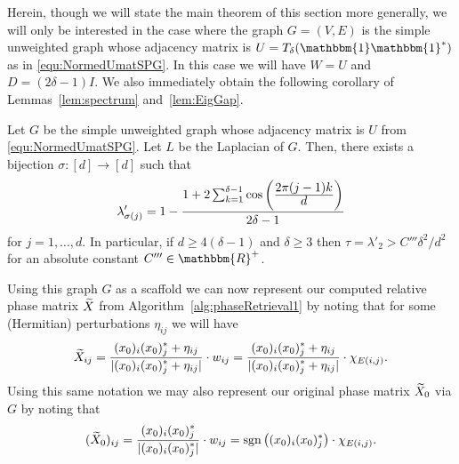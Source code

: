 Herein, though we will state the main theorem of this section more generally, we will only be interested in the case where the graph $G=(V,E)$ is the simple unweighted graph whose adjacency matrix is $U = T_{\delta}(\mathbbm{1} \mathbbm{1}^*)$ as in \eqref{equ:NormedUmatSPG}.  In this case we will have $W = U$ and $D = (2 \delta - 1)I$.  We also immediately obtain the following corollary of Lemmas~\ref{lem:spectrum} and~\ref{lem:EigGap}.

\begin{cor}
Let $G$ be the simple unweighted graph whose adjacency matrix is $U$ from \eqref{equ:NormedUmatSPG}.  Let $L$ be the Laplacian of $G$.  Then, there exists a bijection $\sigma:[d] \rightarrow [d]$ such that
$$\lambda'_{\sigma(j)} = 1 - \frac{1 + 2 \sum_{k = 1}^{\delta - 1}\cos\left(\frac{\displaystyle 2\pi (j-1) k}{\displaystyle d}\right)}{2 \delta - 1}$$
for $j = 1, \dots, d$.  In particular, if $d \geq 4(\delta - 1)$ and $\delta \geq 3$ then $\tau = \lambda'_2 > C'''\delta^2 / d^2$ for an absolute constant $C''' \in \mathbbm{R}^+$.
\label{cor:Gspectrum}
\end{cor}

Using this graph $G$ as a scaffold we can now represent our computed relative phase matrix $\widetilde{X}$ from Algorithm~\ref{alg:phaseRetrieval1} by noting that for some (Hermitian) perturbations $\eta_{ij}$ 
we will have 
\begin{equation}
\widetilde{X}_{ij} = \frac{\displaystyle (x_0)_i(x_0)_j^* + \eta_{ij}}{\displaystyle |(x_0)_i(x_0)_j^* + \eta_{ij}|} \cdot w_{ij} = \frac{\displaystyle (x_0)_i(x_0)_j^* + \eta_{ij}}{\displaystyle |(x_0)_i(x_0)_j^* + \eta_{ij}|} \cdot \chi_{E(i, j)}.
\label{equ:DeftildeXviaGcomp}
\end{equation}
 Using this same notation we may also represent our original phase matrix $\widetilde{X}_0$ %
via $G$ by noting that
\begin{equation}
(\widetilde{X}_0)_{ij} = \frac{\displaystyle (x_0)_i(x_0)_j^*}{\displaystyle |(x_0)_i(x_0)_j^*|} \cdot w_{ij} = \mathrm{sgn} \left( (x_0)_i(x_0)_j^* \right) \cdot \chi_{E(i, j)}.
\label{equ:DeftildeXviaGpure}
\end{equation}

